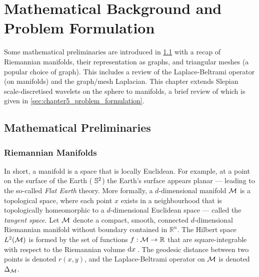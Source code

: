 \section{Mathematical Background and Problem Formulation}\label{sec:chapter5_mathematical_background_problem_formulation}

Some mathematical preliminaries are introduced in \cref{sec:chapter5_mathematical_preliminaries} with a recap of Riemannian manifolds, their representation as graphs, and triangular meshes (a popular choice of graph).
This includes a review of the Laplace-Beltrami operator (on manifolds) and the graph/mesh Laplacian.
This chapter extends Slepian scale-discretised wavelets on the sphere to manifolds, a brief review of which is given in \cref{sec:chapter5_problem_formulation}.

\subsection{Mathematical Preliminaries}\label{sec:chapter5_mathematical_preliminaries}

\subsubsection{Riemannian Manifolds}

In short, a manifold is a space that is locally Euclidean.
For example, at a point on the surface of the Earth (\ie{} \(\mathbb{S}^{2}{}\)) the Earth's surface appears planar --- leading to the so-called \emph{Flat Earth} theory.
More formally, a \(d\)-dimensional manifold \(\mathcal{M}{}\) is a topological space, where each point \(x\) exists in a neighbourhood that is topologically homeomorphic to a \(d\)-dimensional Euclidean space --- called the \emph{tangent space}.
Let \(\mathcal{M}{}\) denote a compact, smooth, connected \(d\)-dimensional Riemannian manifold without boundary contained in \(\mathbb{R}^{n}\).
The Hilbert space \(L^{2}(\mathcal{M})\) is formed by the set of functions \(f : \mathcal{M} \to \mathbb{R}\) that are square-integrable with respect to the Riemannian volume \(\dd{x}{}\).
The geodesic distance between two points is denoted \(r(x,y)\), and the Laplace-Beltrami operator on \(\mathcal{M}{}\) is denoted \(\Delta_{\mathcal{M}}\).

